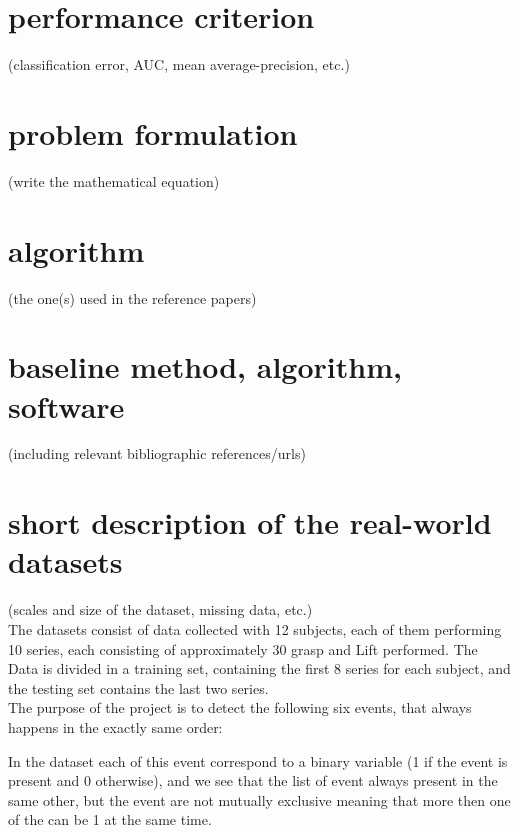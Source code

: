 \documentclass[final,leqno,onefignum,onetabnum]{siamltexmm}
\begin{document}
\section{performance criterion}
(classification error, AUC, mean average-precision, etc.)

\section{problem formulation}
(write the mathematical equation)

\section{algorithm}
 (the one(s) used in the reference papers)

\section{baseline method, algorithm, software}
(including relevant bibliographic references/urls)\\






\section{short description of the real-world datasets}
(scales and size of the dataset, missing data, etc.)\\
The  datasets consist of data collected with 12 subjects, each of them performing 10 series, each consisting of approximately 30 grasp and Lift performed. The Data is divided in a  training set, containing the first 8 series for each subject, and  the testing set contains the last two series.\\
The purpose of the project is to detect the following six events, that always happens in the exactly same order: 

In the dataset each of this event correspond to a binary variable (1 if the event is present and 0 otherwise), and we see that the list of event always present in the same other, but the event are not mutually exclusive meaning that more then one of the can be 1 at the same time.\\
 



\end{document}

